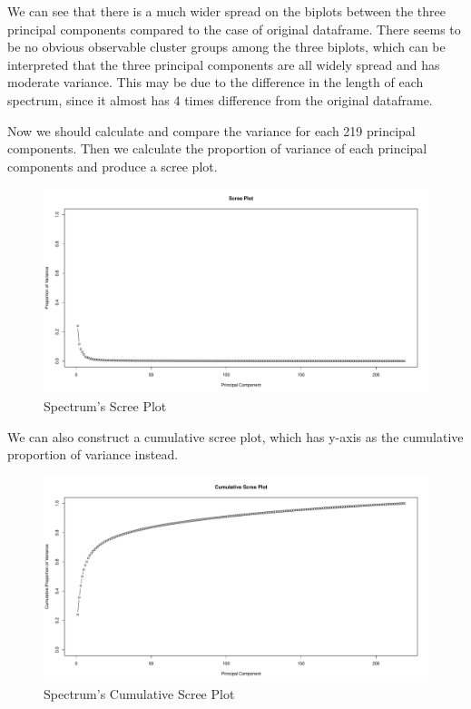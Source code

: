 We can see that there is a much wider spread on the biplots between the three principal components compared to the case of original dataframe. There seems to be no obvious observable cluster groups among the three biplots, which can be interpreted that the three principal components are all widely spread and has moderate variance.
This may be due to the difference in the length of each spectrum, since it almost has 4 times difference from the original dataframe.

Now we should calculate and compare the variance for each 219 principal components. Then we calculate the proportion of variance of each principal components and produce a scree plot.

\begin{figure}[H]
    \centering
    \includegraphics[width=12cm]{images/PCA (Spec)/Scree Plot.pdf}
    \caption{Spectrum's Scree Plot}
    \label{fig:Spec screeplot} 
\end{figure}

We can also construct a cumulative scree plot, which has y-axis as the cumulative proportion of variance instead.

\begin{figure}[H]
    \centering
    \includegraphics[width=12cm]{images/PCA (Spec)/Cumulative Scree Plot.pdf}
    \caption{Spectrum's Cumulative Scree Plot}
    \label{fig:Spec cumscreeplot} 
\end{figure}

